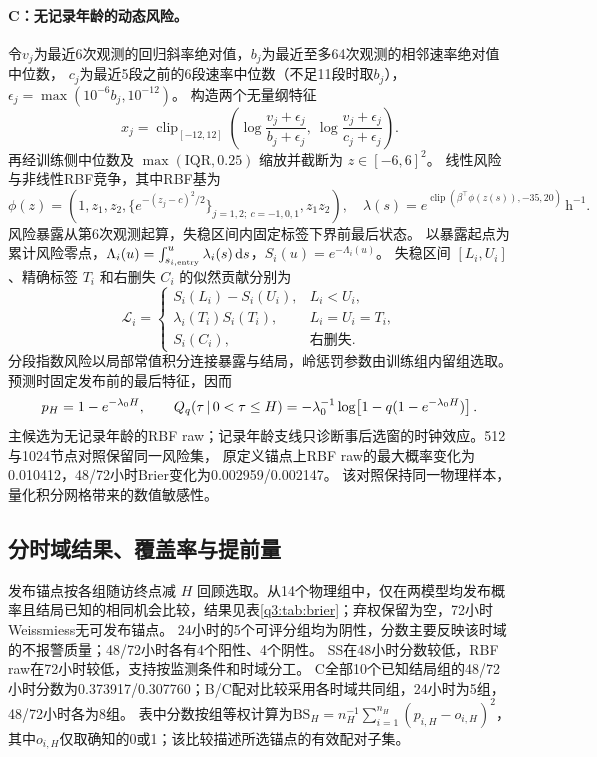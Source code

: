 \paragraph{C：无记录年龄的动态风险。}
令$v_j$为最近6次观测的回归斜率绝对值，$b_j$为最近至多64次观测的相邻速率绝对值中位数，
$c_j$为最近5段之前的6段速率中位数（不足11段时取$b_j$），$\epsilon_j=\max(10^{-6}b_j,10^{-12})$。
构造两个无量纲特征
\begin{equation}
 x_j=\operatorname{clip}_{[-12,12]}\left(
 \log\frac{v_j+\epsilon_j}{b_j+\epsilon_j},\
 \log\frac{v_j+\epsilon_j}{c_j+\epsilon_j}\right).
 \label{q3:eq:features}
\end{equation}
再经训练侧中位数及 $\max(\mathrm{IQR},0.25)$ 缩放并截断为 $z\in[-6,6]^2$。
线性风险与非线性RBF竞争，其中RBF基为
\begin{equation}
 \phi(z)=\left(1,z_1,z_2,
 \{e^{-(z_j-c)^2/2}\}_{j=1,2;\ c=-1,0,1},z_1z_2\right),\quad
 \lambda(s)=e^{\operatorname{clip}(\beta^\top\phi(z(s)),-35,20)}\,\mathrm h^{-1}.
 \label{q3:eq:hazard}
\end{equation}
风险暴露从第6次观测起算，失稳区间内固定标签下界前最后状态。
以暴露起点为累计风险零点，$\Lambda_i(u)=\int_{s_{i,\mathrm{entry}}}^{u}\lambda_i(s)\mathop{}\!\mathrm d s$，$S_i(u)=e^{-\Lambda_i(u)}$。
失稳区间 $[L_i,U_i]$、精确标签 $T_i$ 和右删失 $C_i$ 的似然贡献分别为
\begin{equation}
 \mathcal L_i=\begin{cases}
 S_i(L_i)-S_i(U_i),&L_i<U_i,\\
 \lambda_i(T_i)S_i(T_i),&L_i=U_i=T_i,\\
 S_i(C_i),&\text{右删失}.
 \end{cases}\label{q3:eq:likelihood}
\end{equation}
分段指数风险以局部常值积分连接暴露与结局\cite{q3-friedman1982}，岭惩罚参数由训练组内留组选取。预测时固定发布前的最后特征，因而
\begin{equation}
 p_H=1-e^{-\lambda_0H},\qquad
 Q_q(\tau\,\vert\,0<\tau\le H)=-\lambda_0^{-1}\log\!\left[1-q(1-e^{-\lambda_0H})\right].
 \label{q3:eq:hazardquantile}
\end{equation}
主候选为无记录年龄的RBF raw；记录年龄支线只诊断事后选窗的时钟效应。512与1024节点对照保留同一风险集，
原定义锚点上RBF raw的最大概率变化为0.010412，48/72小时Brier变化为0.002959/0.002147。
该对照保持同一物理样本，量化积分网格带来的数值敏感性。

\subsection{分时域结果、覆盖率与提前量}\label{q3:sec:results}
发布锚点按各组随访终点减 $H$ 回顾选取。从14个物理组中，仅在两模型均发布概率且结局已知的相同机会比较，结果见表\ref{q3:tab:brier}；弃权保留为空，72小时Weissmiess无可发布锚点。
24小时的5个可评分组均为阴性，分数主要反映该时域的不报警质量；48/72小时各有4个阳性、4个阴性。
SS在48小时分数较低，RBF raw在72小时较低，支持按监测条件和时域分工。
C全部10个已知结局组的48/72小时分数为0.373917/0.307760；B/C配对比较采用各时域共同组，24小时为5组，48/72小时各为8组。
表中分数按组等权计算为$\mathrm{BS}_H=n_H^{-1}\sum_{i=1}^{n_H}(p_{i,H}-o_{i,H})^2$，
其中$o_{i,H}$仅取确知的0或1；该比较描述所选锚点的有效配对子集。

